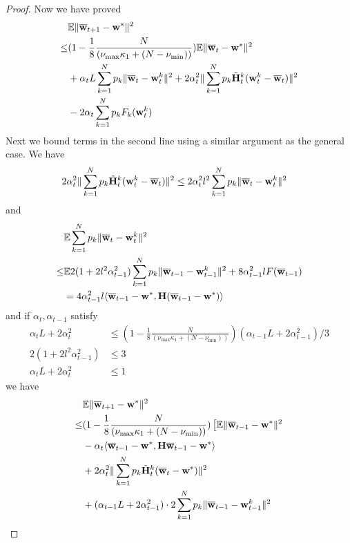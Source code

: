 \begin{proof}
	Now we have proved 
	\begin{align*}
	&\mathbb{E}\|{\overline{\mathbf{w}}}_{t+1}-{\mathbf{w}}^{\ast}\|^{2}  \\
	\leq &(1-\frac{1}{8}\frac{N}{(\nu_{\max}\kappa_{1}+(N-\nu_{\min}))})\mathbb{E}\|{\overline{\mathbf{w}}}_{t}-{\mathbf{w}}^{\ast}\|^{2}\\
	&+\alpha_{t}L\sum_{k=1}^{N}p_{k}\|{\overline{\mathbf{w}}}_{t}-{\mathbf{w}}_{t}^{k}\|^{2}+2\alpha_{t}^{2}\|\sum_{k=1}^{N}p_{k}\tilde{{\mathbf{H}}}_{t}^{k}({\mathbf{w}}_{t}^{k} -{\overline{\mathbf{w}}}_{t})\|^{2}\\
	&-2\alpha_{t}\sum_{k=1}^{N}p_{k}F_{k}({\mathbf{w}}_{t}^{k})
	\end{align*}
	Next we bound terms in the second line using a similar argument as
	the general case. We have 
	\begin{align*}
	2\alpha_{t}^{2}\|\sum_{k=1}^{N}p_{k}\tilde{{\mathbf{H}}}_{t}^{k}({\mathbf{w}}_{t}^{k}-{\overline{\mathbf{w}}}_{t})\|^{2} & \leq2\alpha_{t}^{2}l^{2}\sum_{k=1}^{N}p_{k}\|{\overline{\mathbf{w}}}_{t}-{\mathbf{w}}_{t}^{k}\|^{2}
	\end{align*}
	and 
	\begin{align*}
	 &\mathbb{E}\sum_{k=1}^{N}p_{k}\|{\overline{\mathbf{w}}}_{t}-{\mathbf{w}}_{t}^{k}\|^{2} \\
	\leq&\mathbb{E}2(1+2l^{2}\alpha_{t-1}^{2})\sum_{k=1}^{N}p_{k}\|{\overline{\mathbf{w}}}_{t-1}-{\mathbf{w}}_{t-1}^{k}\|^{2}+8\alpha_{t-1}^{2}lF({\overline{\mathbf{w}}}_{t-1})\\
	& =4\alpha_{t-1}^{2}l\langle{\overline{\mathbf{w}}}_{t-1}-{\mathbf{w}}^{\ast},{\mathbf{H}}({\overline{\mathbf{w}}}_{t-1}-{\mathbf{w}}^{\ast})\rangle
	\end{align*}
	and if $\alpha_{t},\alpha_{t-1}$ satisfy 
	\begin{align*}
	\alpha_{t}L+2\alpha_{t}^{2} & \leq(1-\frac{1}{8}\frac{N}{(\nu_{\max}\kappa_{1}+(N-\nu_{\min}))})(\alpha_{t-1}L+2\alpha_{t-1}^{2})/3\\
	2(1+2l^{2}\alpha_{t-1}^{2}) & \leq3\\
	\alpha_{t}L+2\alpha_{t}^{2} & \leq1
	\end{align*}
	we have 
	\begin{align*}
	& \mathbb{E}\|\ov{w}_{t+1}-\vw^{\ast}\|^{2}\\
	\leq&(1-\frac{1}{8}\frac{N}{(\nu_{\max}\kappa_{1}+(N-\nu_{\min}))})\left[\mathbb{E}\|\ov{w}_{t-1}-\vw^{\ast}\|^{2}\right.\\
	&-\alpha_{t}\langle\ov{w}_{t-1}-\vw^{\ast},\vH\ov{w}_{t-1}-\vw^{\ast}\rangle\\
	&+2\alpha_{t}^{2}\|\sum_{k=1}^{N}p_{k}\tilde{\vH}_{t}^{k}(\ov{w}_{t}-\vw^{\ast})\|^{2}\\
	& +(\alpha_{t-1}L+2\alpha_{t-1}^{2})\cdot2\sum_{k=1}^{N}p_{k}\|\ov{w}_{t-1}-\vw_{t-1}^{k}\|^{2}\\

\end{align*}
\end{proof}
